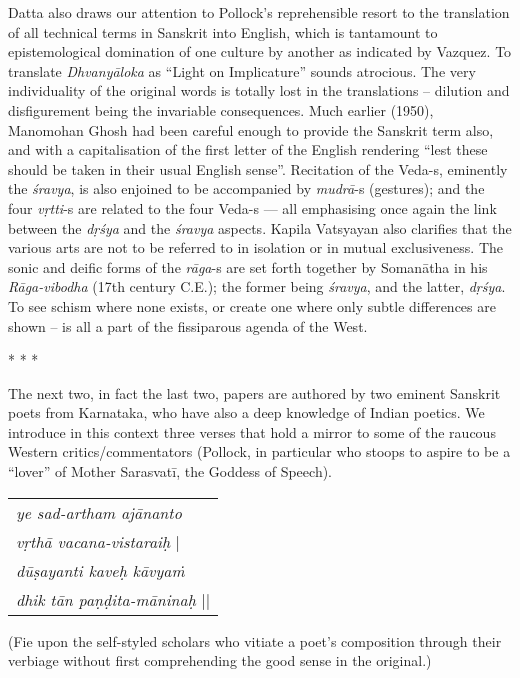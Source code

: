 Datta also draws our attention to Pollock’s reprehensible resort to the translation of all technical terms in Sanskrit into English, which is tantamount to epistemological domination of one culture by another as indicated by Vazquez. To translate \textsl{Dhvanyāloka} as “Light on Implicature” sounds atrocious. The very individuality of the original words is totally lost in the translations -- dilution and disfigurement being the invariable consequences. Much earlier (1950), Manomohan Ghosh had been careful enough to provide the Sanskrit term also, and with a capitalisation of the first letter of the English rendering “lest these should be taken in their usual English sense”. Recitation of the \hbox{Veda-s}, eminently the \textsl{śravya}, is also enjoined to be accompanied by \hbox{\textsl{mudrā}-s} (gestures); and the four \textsl{vṛtti}-s are related to the four Veda-s --- all emphasising once again the link between the \textsl{dṛśya} and the \textsl{śravya} aspects. Kapila Vatsyayan also clarifies that the various arts are not to be referred to in isolation or in mutual exclusiveness. The sonic and deific forms of the \textsl{rāga}-s are set forth together by Somanātha in his \textsl{Rāga-vibodha} (17th century C.E.); the former being \textsl{śravya}, and the latter, \textsl{dṛśya}. To see schism where none exists, or create one where only subtle differences are shown -- is all a part of the fissiparous agenda of the West.
\begin{center}
* * *
\end{center}
The next two, in fact the last two, papers are authored by two eminent Sanskrit poets from Karnataka, who have also a deep knowledge of Indian poetics. We introduce in this context three verses that hold a mirror to some of the raucous Western critics/commentators (Pollock, in particular who stoops to aspire to be a ``lover'' of Mother Sarasvatī, the Goddess of Speech).
\begin{center}
\begin{tabular}{l}
\textsl{ye sad-artham ajānanto}\\
\phantom{aaaaaa}\textsl{vṛthā vacana-vistaraiḥ} |\\
\textsl{dūṣayanti kaveḥ kāvyaṁ}\\
\phantom{aaaaaa}\textsl{dhik tān paṇḍita-māninaḥ} ||
\end{tabular}
\end{center}
(Fie upon the self-styled scholars who vitiate a poet's composition through their verbiage without first comprehending the good sense in the original.)


